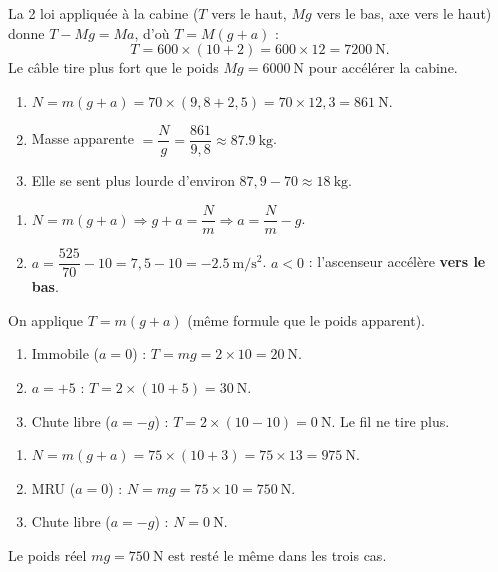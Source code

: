 \documentclass[11pt,a4paper]{article}
\begin{document}

\begin{corrige}
La 2 loi appliquée à la cabine ($T$ vers le haut, $Mg$ vers le bas, axe vers le
haut) donne $T-Mg=Ma$, d'où $T=M(g+a)$ :
\[
T=600\times(10+2)=600\times 12=\qty{7200}{\newton}.
\]
Le câble tire plus fort que le poids $Mg=\qty{6000}{\newton}$ pour accélérer la cabine.
\end{corrige}

\begin{corrige}
\begin{enumerate}[label=\alph*)]
  \item $N=m(g+a)=70\times(9{,}8+2{,}5)=70\times 12{,}3=\qty{861}{\newton}$.
  \item Masse apparente $=\dfrac{N}{g}=\dfrac{861}{9{,}8}\approx\qty{87.9}{\kilogram}$.
  \item Elle se sent plus lourde d'environ $87{,}9-70\approx\qty{18}{\kilogram}$.
\end{enumerate}
\end{corrige}

\begin{corrige}
\begin{enumerate}[label=\alph*)]
  \item $N=m(g+a)\Rightarrow g+a=\dfrac{N}{m}\Rightarrow a=\dfrac{N}{m}-g$.
  \item $a=\dfrac{525}{70}-10=7{,}5-10=-\qty{2.5}{\metre\per\second\squared}$.
        $a<0$ : l'ascenseur accélère \textbf{vers le bas}.
\end{enumerate}
\end{corrige}

\begin{corrige}
On applique $T=m(g+a)$ (même formule que le poids apparent).
\begin{enumerate}[label=\alph*)]
  \item Immobile ($a=0$) : $T=mg=2\times 10=\qty{20}{\newton}$.
  \item $a=+5$ : $T=2\times(10+5)=\qty{30}{\newton}$.
  \item Chute libre ($a=-g$) : $T=2\times(10-10)=\qty{0}{\newton}$. Le fil ne tire plus.
\end{enumerate}
\end{corrige}

\begin{corrige}
\begin{enumerate}[label=\alph*)]
  \item $N=m(g+a)=75\times(10+3)=75\times 13=\qty{975}{\newton}$.
  \item MRU ($a=0$) : $N=mg=75\times 10=\qty{750}{\newton}$.
  \item Chute libre ($a=-g$) : $N=\qty{0}{\newton}$.
\end{enumerate}
Le poids réel $mg=\qty{750}{\newton}$ est resté le même dans les trois cas.
\end{corrige}
\end{document}
